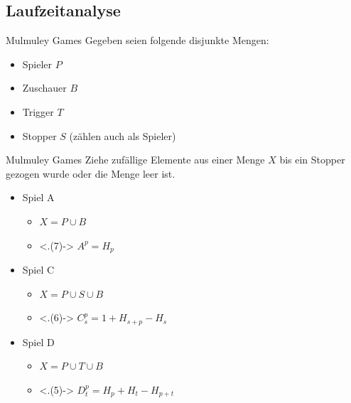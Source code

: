 \documentclass[t]{beamer}
\theoremstyle{plain}
\begin{document}
\subsection{Laufzeitanalyse}
\begin{frame}{Mulmuley Games}
    Gegeben seien folgende disjunkte Mengen:
    \begin{itemize}
        \item Spieler $P$
        \item Zuschauer $B$
        \item Trigger $T$
        \item Stopper $S$ (zählen auch als Spieler)
    \end{itemize}


\end{frame}
\begin{frame}{Mulmuley Games}
    Ziehe zufällige Elemente aus einer Menge $X$ bis ein Stopper gezogen wurde oder die Menge leer ist.
    \begin{itemize}
        \item Spiel A
        \begin{itemize}
            \item $X = P \cup B$
            \item<.(7)-> $A^p = H_p$
        \end{itemize}
        \item Spiel C
        \begin{itemize}
            \item $X = P \cup S \cup B$
            \item<.(6)-> $C_s^p = 1 + H_{s+p} - H_s$
        \end{itemize}
        \item Spiel D
        \begin{itemize}
            \item $X = P \cup T \cup B$
            \item<.(5)-> $D_t^p = H_p + H_t - H_{p+t}$
        \end{itemize}
    \end{itemize}

\end{frame}
\end{document}
